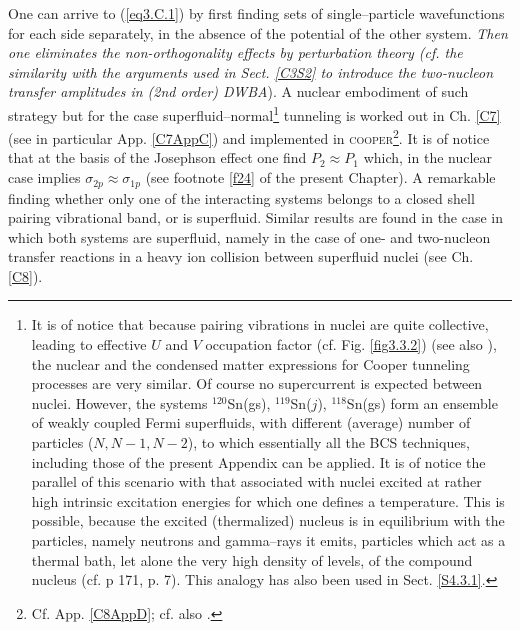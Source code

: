 One can arrive to  (\ref{eq3.C.1}) by first finding sets of single--particle wavefunctions for each side separately, in the absence of the potential of the other system. \textit{Then one eliminates the non-orthogonality effects by perturbation theory (cf. the similarity with the arguments used in Sect. \ref{C3S2} to introduce the two-nucleon transfer amplitudes in (2nd order) DWBA}). A nuclear embodiment of such strategy but for the case superfluid--normal\footnote{\label{f45}It is of notice that because  pairing vibrations in nuclei are quite collective, leading to effective $U$ and $V$ occupation factor (cf. Fig. \ref{fig3.3.2}) (see also \cite{Potel:13b}), the nuclear and the condensed matter expressions for Cooper tunneling processes are very similar. Of course no supercurrent is expected between nuclei. However, the systems $^{120}$Sn(gs), $^{119}$Sn($j$), $^{118}$Sn(gs) form an ensemble of weakly coupled Fermi superfluids, with different (average) number of particles ($N,N-1,N-2$), to which essentially all the BCS techniques, including those of the present Appendix can be applied. It is of notice the parallel of this scenario with that associated with nuclei excited at rather high intrinsic excitation energies for which one defines a temperature. This is possible, because the excited (thermalized) nucleus is in equilibrium with the particles, namely neutrons and gamma--rays it emits, particles which act as a thermal bath, let alone the very high density of levels, of the compound nucleus (cf. \cite{Bertsch:05} p 171, \cite{Bortignon:98} p. 7). This analogy has also been used in Sect. \ref{S4.3.1}.} tunneling is worked out in Ch. \ref{C7} (see in particular App. \ref{C7AppC}) and implemented in \textsc{cooper}\footnote{Cf. App. \ref{C8AppD}; cf. also \cite{Broglia:04a}.}. It is of notice that at the basis of the Josephson effect one find $P_2\approx P_1$ which, in the nuclear case implies $\sigma_{2p}\approx\sigma_{1p}$ (see footnote \ref{f24} of the present Chapter). A remarkable finding whether only one of the interacting systems belongs to a closed shell pairing vibrational band, or is superfluid. Similar results are found in the case in which both systems are superfluid, namely in the case of  one- and two-nucleon transfer reactions in a heavy ion collision between superfluid nuclei (see Ch. \ref{C8}). 


